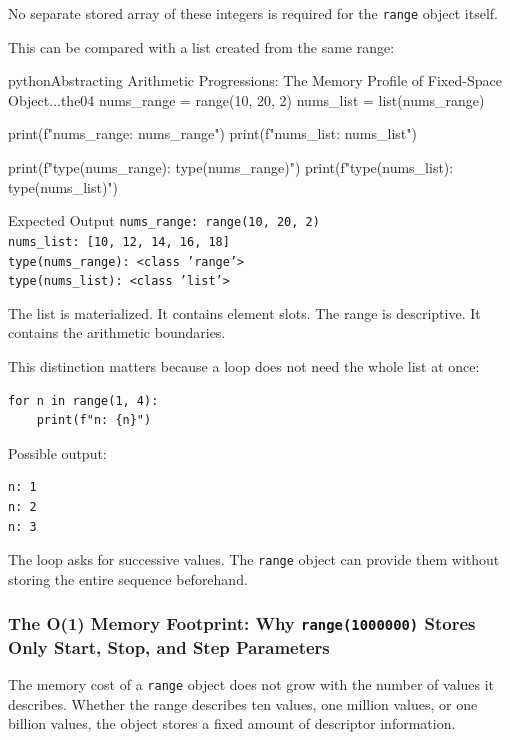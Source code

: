 \documentclass[a4paper,twoside]{report}
\begin{document}
No separate stored array of these integers is required for the \texttt{range} object itself.

This can be compared with a list created from the same range:

\begin{codebox}[]{python}{Abstracting Arithmetic Progressions: The Memory Profile of Fixed-Space Object...}{the04}
nums_range = range(10, 20, 2)
nums_list = list(nums_range)

print(f"nums_range: {nums_range}")
print(f"nums_list: {nums_list}")

print(f"type(nums_range): {type(nums_range)}")
print(f"type(nums_list): {type(nums_list)}")
\end{codebox}


\begin{iobox}{Expected Output}
\texttt{nums\_range: range(10, 20, 2)} \\
\texttt{nums\_list: [10, 12, 14, 16, 18]} \\
\texttt{type(nums\_range): <class 'range'>} \\
\texttt{type(nums\_list): <class 'list'>} \\
\end{iobox}


The list is materialized. It contains element slots. The range is descriptive. It contains the arithmetic boundaries.

This distinction matters because a loop does not need the whole list at once:

\begin{verbatim}
for n in range(1, 4):
    print(f"n: {n}")
\end{verbatim}

Possible output:

\begin{verbatim}
n: 1
n: 2
n: 3
\end{verbatim}

The loop asks for successive values. The \texttt{range} object can provide them without storing the entire sequence beforehand.

\subsubsection{The O(1) Memory Footprint: Why \texttt{range(1000000)} Stores Only Start, Stop, and Step Parameters}

The memory cost of a \texttt{range} object does not grow with the number of values it describes. Whether the range describes ten values, one million values, or one billion values, the object stores a fixed amount of descriptor information.
\end{document}
